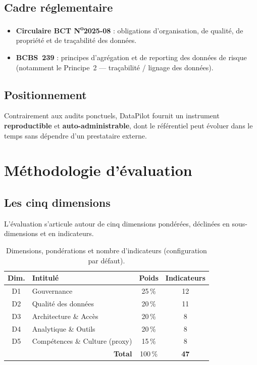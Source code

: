 \documentclass[11pt,a4paper]{report}
\begin{document}
\section{Cadre réglementaire}
\begin{itemize}[noitemsep]
  \item \textbf{Circulaire BCT N\textsuperscript{o}2025-08} : obligations
  d'organisation, de qualité, de propriété et de traçabilité des données.
  \item \textbf{BCBS~239} : principes d'agrégation et de reporting des données de
  risque (notamment le Principe~2 — traçabilité / lignage des données).
\end{itemize}

\section{Positionnement}
Contrairement aux audits ponctuels, DataPilot fournit un instrument
\textbf{reproductible} et \textbf{auto-administrable}, dont le référentiel peut
évoluer dans le temps sans dépendre d'un prestataire externe.

\chapter{Méthodologie d'évaluation}

\section{Les cinq dimensions}
L'évaluation s'articule autour de cinq dimensions pondérées, déclinées en
sous-dimensions et en indicateurs.

\begin{table}[h]
\centering
\caption{Dimensions, pondérations et nombre d'indicateurs (configuration par défaut).}
\begin{tabular}{clcc}
\toprule
\textbf{Dim.} & \textbf{Intitulé} & \textbf{Poids} & \textbf{Indicateurs}\\
\midrule
D1 & Gouvernance & 25\,\% & 12 \\
D2 & Qualité des données & 20\,\% & 11 \\
D3 & Architecture \& Accès & 20\,\% & 8 \\
D4 & Analytique \& Outils & 20\,\% & 8 \\
D5 & Compétences \& Culture (proxy) & 15\,\% & 8 \\
\midrule
\multicolumn{2}{r}{\textbf{Total}} & 100\,\% & \textbf{47}\\
\bottomrule
\end{tabular}
\end{table}
\end{document}
